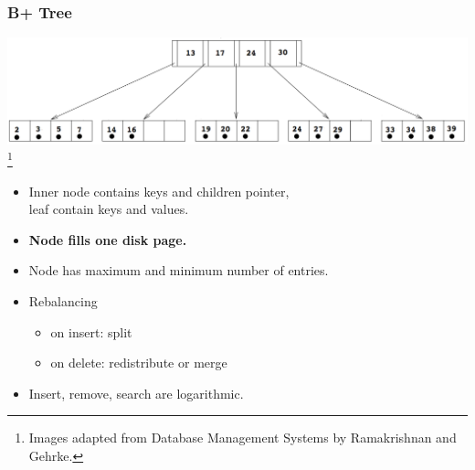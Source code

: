 \documentclass{beamer}
\newcommand\blfootnote[1]{%
  \begingroup
  \renewcommand\thefootnote{}\footnote{#1}%
  \addtocounter{footnote}{-1}%
  \endgroup
}
\begin{document}
    \begin{frame}
      \frametitle{B+ Tree}
      \includegraphics[scale=0.2]{B+Tree.png}
      \blfootnote{\tiny Images adapted from Database Management Systems by Ramakrishnan and Gehrke.}
      \vspace{1em}
      \begin{itemize}
        \item Inner node contains keys and children pointer, \\leaf contain keys and values.
        \item \textbf{Node fills one disk page.}
        \item Node has maximum and minimum number of entries.
        \pause
        \item Rebalancing
          \begin{itemize}
            \item on insert: split
            \item on delete: redistribute or merge
          \end{itemize}
        \pause
        \item Insert, remove, search are logarithmic.
      \end{itemize}
    \end{frame}
\end{document}
